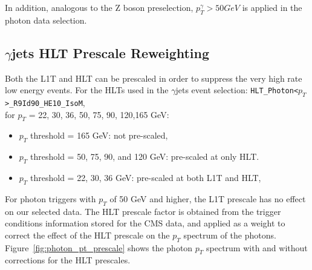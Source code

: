 In addition, analogous to the Z boson preselection, $p_T ^{\gamma} > 50GeV$ is applied in the photon data selection.

\subsection{$\gamma$jets HLT Prescale Reweighting}\label{sec:bg_gjetHLT}
Both the L1T and HLT can be prescaled in order to suppress the very high rate low energy events. For the HLTs used in the $\gamma$jets event selection:
\texttt{HLT\_Photon<$p_T$>\_R9Id90\_HE10\_IsoM}, \\
 for $p_T$ = 22, 30, 36, 50, 75, 90, 120,165 GeV:
\begin{itemize}
\item $p_T$ threshold = 165 GeV: not pre-scaled, 
\item $p_T$ threshold = 50, 75, 90, and 120 GeV:  pre-scaled at only HLT.  
\item $p_T$ threshold = 22, 30, 36 GeV: pre-scaled at both L1T and HLT, 
\end{itemize}

For photon triggers with $p_T$ of 50 GeV and higher, the L1T prescale has no effect on our selected data. The HLT prescale factor is obtained from the trigger conditions information stored for the CMS data, and applied as a weight to correct the effect of the HLT prescale on the $p_T$ spectrum of the photons. Figure~\ref{fig:photon_pt_prescale} shows the photon $p_T$ spectrum with and without corrections for the HLT prescales.


